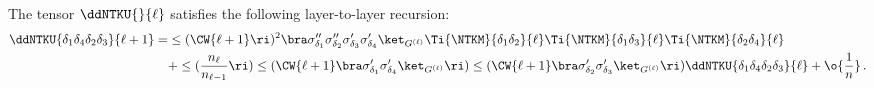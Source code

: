 The tensor $\ddNTKU{}{\ell}$ satisfies the following layer-to-layer recursion:
\begin{align}\label{eq:U-recursion}\index{ddNTKs!statistics!U-recursion@$U$-recursion}
\ddNTKU{\delta_1\delta_4\delta_2\delta_3}{\ell+1}=&\le(\CW{\ell+1}\ri)^2\bra \sigma^{\prime\prime}_{\delta_1} \sigma^{\prime\prime}_{\delta_2} \sigma^{\prime}_{\delta_3}\sigma^{\prime}_{\delta_4}\ket_{G^{(\ell)}}\Ti{\NTKM}{\delta_1\delta_2}{\ell}\Ti{\NTKM}{\delta_1\delta_3}{\ell}\Ti{\NTKM}{\delta_2\delta_4}{\ell}\,\\
&+\le(\frac{n_{\ell}}{n_{\ell-1}}\ri)\le(\CW{\ell+1}\bra \sigma^{\prime}_{\delta_1}\sigma^{\prime}_{\delta_4}\ket_{G^{(\ell)}}\ri)\le(\CW{\ell+1}\bra \sigma^{\prime}_{\delta_2}\sigma^{\prime}_{\delta_3}\ket_{G^{(\ell)}}\ri)\ddNTKU{\delta_1\delta_4\delta_2\delta_3}{\ell}+\o{\frac{1}{n}}\, .\notag
\end{align}
